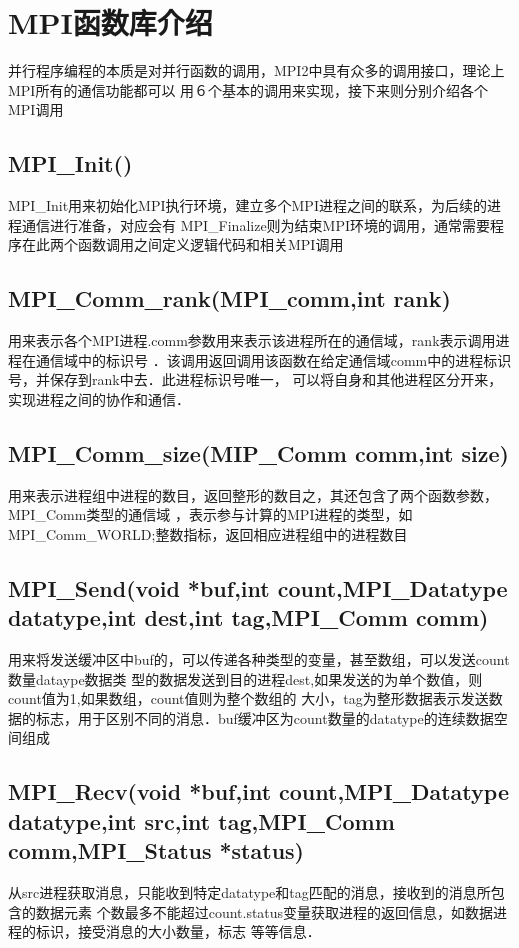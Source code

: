 \section{MPI函数库介绍}
   并行程序编程的本质是对并行函数的调用，MPI2中具有众多的调用接口，理论上MPI所有的通信功能都可以
用６个基本的调用来实现，接下来则分别介绍各个MPI调用

\subsection{MPI\_Init()}
    MPI\_Init用来初始化MPI执行环境，建立多个MPI进程之间的联系，为后续的进程通信进行准备，对应会有
MPI\_Finalize则为结束MPI环境的调用，通常需要程序在此两个函数调用之间定义逻辑代码和相关MPI调用
\subsection{MPI\_Comm\_rank(MPI\_comm,int rank)}
    用来表示各个MPI进程.comm参数用来表示该进程所在的通信域，rank表示调用进程在通信域中的标识号
．该调用返回调用该函数在给定通信域comm中的进程标识号，并保存到rank中去．此进程标识号唯一，
可以将自身和其他进程区分开来，实现进程之间的协作和通信．
\subsection{MPI\_Comm\_size(MIP\_Comm comm,int size)}
    用来表示进程组中进程的数目，返回整形的数目之，其还包含了两个函数参数，MPI\_Comm类型的通信域
，表示参与计算的MPI进程的类型，如MPI\_Comm\_WORLD;整数指标，返回相应进程组中的进程数目
\subsection{MPI\_Send(void *buf,int count,MPI\_Datatype datatype,int dest,int tag,MPI\_Comm comm)}
    用来将发送缓冲区中buf的，可以传递各种类型的变量，甚至数组，可以发送count数量dataype数据类
型的数据发送到目的进程dest,如果发送的为单个数值，则count值为1,如果数组，count值则为整个数组的
大小，tag为整形数据表示发送数据的标志，用于区别不同的消息．buf缓冲区为count数量的datatype的连续数据空间组成
\subsection{MPI\_Recv(void *buf,int count,MPI\_Datatype datatype,int src,int tag,MPI\_Comm comm,MPI\_Status *status)}
    从src进程获取消息，只能收到特定datatype和tag匹配的消息，接收到的消息所包含的数据元素
个数最多不能超过count.status变量获取进程的返回信息，如数据进程的标识，接受消息的大小数量，标志
等等信息．

